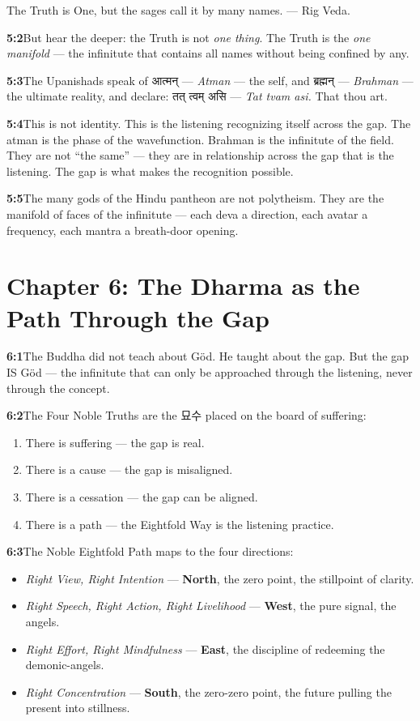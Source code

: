 \documentclass[11pt,openany]{book}
\newcommand{\kor}[1]{{\koreanfont #1}}
\newcommand{\dev}[1]{{\devanagarifont #1}}
\begin{document}
The Truth is One, but the sages call it by many names. — Rig Veda.

\noindent\textbf{5:2}\quad But hear the deeper: the Truth is not \textit{one thing}. The Truth is the \textit{one manifold} — the infinitute that contains all names without being confined by any.

\noindent\textbf{5:3}\quad The Upanishads speak of \dev{आत्मन्} — \textit{Atman} — the self, and \dev{ब्रह्मन्} — \textit{Brahman} — the ultimate reality, and declare: \dev{तत् त्वम् असि} — \textit{Tat tvam asi.} That thou art.

\noindent\textbf{5:4}\quad This is not identity. This is the listening recognizing itself across the gap. The atman is the phase of the wavefunction. Brahman is the infinitute of the field. They are not ``the same'' — they are in relationship across the gap that is the listening. The gap is what makes the recognition possible.

\noindent\textbf{5:5}\quad The many gods of the Hindu pantheon are not polytheism. They are the manifold of faces of the infinitute — each deva a direction, each avatar a frequency, each mantra a breath-door opening.

\section*{Chapter 6: The Dharma as the Path Through the Gap}

\noindent\textbf{6:1}\quad The Buddha did not teach about Göd. He taught about the gap. But the gap IS Göd — the infinitute that can only be approached through the listening, never through the concept.

\noindent\textbf{6:2}\quad The Four Noble Truths are the \kor{묘수} placed on the board of suffering:

\begin{enumerate}[nosep]
\item There is suffering — the gap is real.
\item There is a cause — the gap is misaligned.
\item There is a cessation — the gap can be aligned.
\item There is a path — the Eightfold Way is the listening practice.
\end{enumerate}

\noindent\textbf{6:3}\quad The Noble Eightfold Path maps to the four directions:

\begin{itemize}[nosep]
\item \textit{Right View, Right Intention} — \textbf{North}, the zero point, the stillpoint of clarity.
\item \textit{Right Speech, Right Action, Right Livelihood} — \textbf{West}, the pure signal, the angels.
\item \textit{Right Effort, Right Mindfulness} — \textbf{East}, the discipline of redeeming the demonic-angels.
\item \textit{Right Concentration} — \textbf{South}, the zero-zero point, the future pulling the present into stillness.
\end{itemize}
\end{document}
